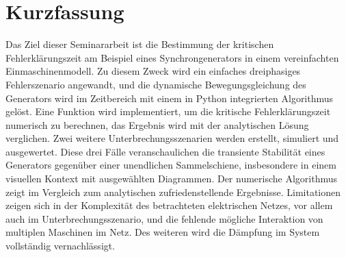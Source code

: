 \section*{Kurzfassung}

Das Ziel dieser Seminararbeit ist die Bestimmung der kritischen Fehlerklärungszeit am Beispiel eines Synchrongenerators in einem vereinfachten Einmaschinenmodell. Zu diesem Zweck wird ein einfaches dreiphasiges Fehlerszenario angewandt, und die dynamische Bewegungsgleichung des Generators wird im Zeitbereich mit einem in Python integrierten Algorithmus gelöst. Eine Funktion wird implementiert, um die kritische Fehlerklärungszeit numerisch zu berechnen, das Ergebnis wird mit der analytischen Lösung verglichen. Zwei weitere Unterbrechungsszenarien werden erstellt, simuliert und
ausgewertet. Diese drei Fälle veranschaulichen die transiente Stabilität eines Generators gegenüber einer unendlichen Sammelschiene, insbesondere in einem visuellen Kontext mit ausgewählten Diagrammen. Der numerische Algorithmus zeigt im Vergleich zum analytischen zufriedenstellende Ergebnisse. Limitationen zeigen sich in der Komplexität des betrachteten elektrischen Netzes, vor allem auch im Unterbrechungsszenario, und die fehlende mögliche Interaktion von multiplen Maschinen im Netz. Des weiteren wird die Dämpfung im System vollständig vernachlässigt.
